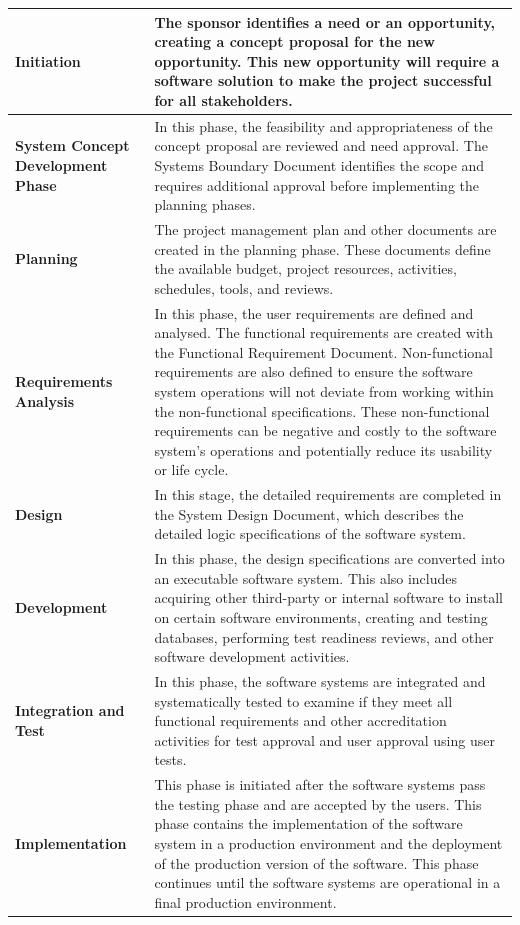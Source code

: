 \begin{xltabular}{\textwidth}{|l|X|}
	\textbf{Initiation} & The sponsor identifies a need or an opportunity, creating a concept proposal for the new opportunity. This new opportunity will require a software solution to make the project successful for all stakeholders.\\ \hline
	\textbf{System Concept Development Phase} & In this phase, the feasibility and appropriateness of the concept proposal are reviewed and need approval. The Systems Boundary Document identifies the scope and requires additional approval before implementing the planning phases. \\ \hline
	\textbf{Planning} & The project management plan and other documents are created in the planning phase. These documents define the available budget, project resources, activities, schedules, tools, and reviews. \\ \hline
	\textbf{Requirements Analysis} & In this phase, the user requirements are defined and analysed. The functional requirements are created with the Functional Requirement Document. Non-functional requirements are also defined to ensure the software system operations will not deviate from working within the non-functional specifications. These non-functional requirements can be negative and costly to the software system's operations and potentially reduce its usability or life cycle. \\ \hline
	\textbf{Design} & In this stage, the detailed requirements are completed in the System Design Document, which describes the detailed logic specifications of the software system. \\ \hline
	\textbf{Development} & In this phase, the design specifications are converted into an executable software system. This also includes acquiring other third-party or internal software to install on certain software environments, creating and testing databases, performing test readiness reviews, and other software development activities. \\ \hline
	\textbf{Integration and Test} & In this phase, the software systems are integrated and systematically tested to examine if they meet all functional requirements and other accreditation activities for test approval and user approval using user tests. \\ \hline
	\textbf{Implementation} & This phase is initiated after the software systems pass the testing phase and are accepted by the users. This phase contains the implementation of the software system in a production environment and the deployment of the production version of the software. This phase continues until the software systems are operational in a final production environment.\\ \hline

\end{xltabular}
